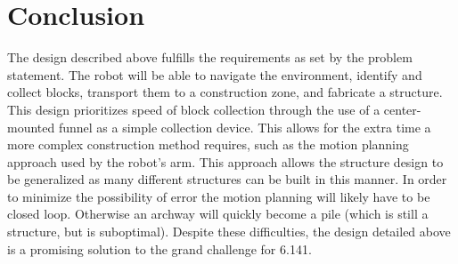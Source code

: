 \documentclass[letterpaper,11pt]{article}
\begin{document}
\section{Conclusion}
The design described above fulfills the requirements as set by the problem statement.
The robot will be able to navigate the environment, identify and collect blocks,
transport them to a construction zone, and fabricate a structure.
This design prioritizes speed of block collection through the use of
a center-mounted funnel as a simple collection device.
This allows for the extra time a more complex construction method requires,
such as the motion planning approach used by the robot's arm.
This approach allows the structure design to be generalized as many different structures can be built in this manner.
In order to minimize the possibility of error the motion planning will likely have to be closed loop.
Otherwise an archway will quickly become a pile (which is still a structure, but is suboptimal).
Despite these difficulties, the design detailed above is a promising solution to the grand challenge for 6.141.
\end{document}
